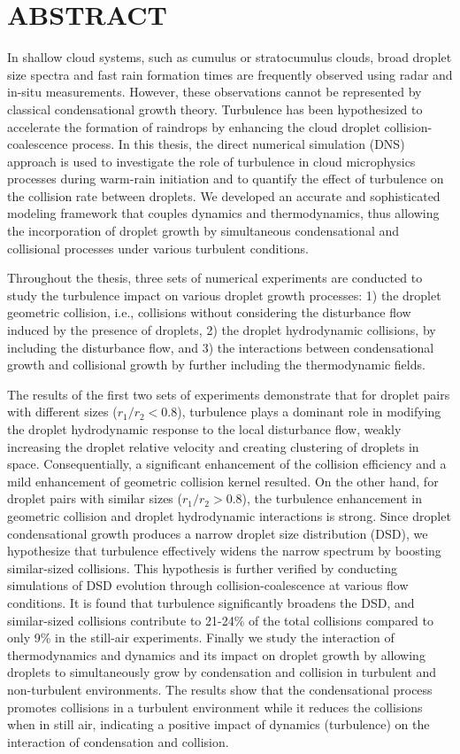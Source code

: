 \documentclass [12pt,letterpaper]{report}
\begin{document}
\newpage
\section*{\centering ABSTRACT}
In shallow cloud systems, such as cumulus or stratocumulus clouds, broad droplet size spectra and fast rain formation times are frequently observed using radar and in-situ measurements. However, these observations cannot be represented by classical condensational growth theory. Turbulence has been hypothesized to accelerate the formation of raindrops by enhancing the cloud droplet collision-coalescence process. In this thesis, the direct numerical simulation (DNS) approach is used to investigate the role of turbulence in cloud microphysics processes during warm-rain initiation and to quantify the effect of turbulence on the collision rate between droplets. We developed an accurate and sophisticated modeling framework that couples dynamics and thermodynamics, thus allowing the incorporation of droplet growth by simultaneous condensational and collisional processes under various turbulent conditions. 

Throughout the thesis, three sets of numerical experiments are conducted to study the turbulence impact on various droplet growth processes: 1) the droplet geometric collision, i.e., collisions without considering the disturbance flow induced by the presence of droplets, 2) the droplet hydrodynamic collisions, by including the disturbance flow, and 3) the interactions between condensational growth and collisional growth by further including the thermodynamic fields. 

The results of the first two sets of experiments demonstrate that for droplet pairs with different sizes ($r_1/r_2<0.8$), turbulence plays a dominant role in modifying the droplet hydrodynamic response to the local disturbance flow, weakly increasing the droplet relative velocity and creating clustering of droplets in space. Consequentially, a significant enhancement of the collision efficiency and a mild enhancement of geometric collision kernel resulted. On the other hand, for droplet pairs with similar sizes ($r_1/r_2>0.8$), the turbulence enhancement in geometric collision and droplet hydrodynamic interactions is strong. Since droplet condensational growth produces a narrow droplet size distribution (DSD), we hypothesize that turbulence effectively widens the narrow spectrum by boosting similar-sized collisions. This hypothesis is further verified by conducting simulations of DSD evolution through collision-coalescence at various flow conditions. It is found that turbulence significantly broadens the DSD, and similar-sized collisions contribute to  21-24\% of the total collisions compared to only 9\% in the still-air experiments. Finally we study the interaction of thermodynamics and dynamics and its impact on droplet growth by allowing droplets to simultaneously grow by condensation and collision in turbulent and non-turbulent environments. The results show that the condensational process promotes collisions in a turbulent environment while it reduces the collisions when in still air, indicating a positive impact of dynamics (turbulence) on the interaction of condensation and collision.
\end{document}

